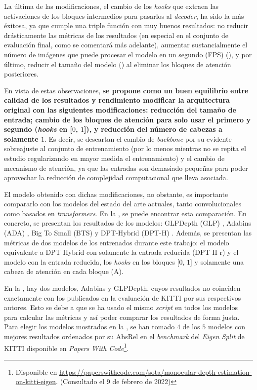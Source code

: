 La última de las modificaciones, el cambio de los \textit{hooks} que extraen las activaciones de los bloques intermedios para pasarlos al \textit{decoder}, ha sido la más éxitosa, ya que cumple una triple función con muy buenos resultados: no reducir drásticamente las métricas de los resultados (en especial en el conjunto de evaluación final, como se comentará más adelante), aumentar sustancialmente el número de imágenes que puede procesar el modelo en un segundo (FPS) (), y por último, reducir el tamaño del modelo () al eliminar los bloques de atención posteriores.

En vista de estas observaciones, \textbf{se propone como un buen equilibrio entre calidad de los resultados y rendimiento modificar la arquitectura original con las siguientes modificaciones: reducción del tamaño de entrada; cambio de los bloques de atención para solo usar el primero y segundo (\textit{hooks} en [$0$, $1$]), y reducción del número de cabezas a solamente $1$}. Es decir, se descartan el cambio de \textit{backbone} por su evidente sobreajuste al conjunto de entrenamiento (por lo menos mientras no se repita el estudio regularizando en mayor medida el entrenamiento) y el cambio de mecanismo de atención, ya que las entradas son demasiado pequeñas para poder aprovechar la reducción de complejidad computacional que lleva asociada.

El modelo obtenido con dichas modificaciones, no obstante, es importante compararlo con los modelos del estado del arte actuales, tanto convolucionales como basados en \textit{transformers}. En la , se puede encontrar esta comparación. En concreto, se presentan los resultados de los modelos: GLPDepth (GLP) \cite{glpdepth}, Adabins (ADA) \cite{bhat2020adabins}, Big To Small (BTS) \cite{bts} y DPT-Hybrid (DPT-H) \cite{visiontransformersDPT}. Además, se presentan las métricas de dos modelos de los entrenados durante este trabajo: el modelo equivalente a DPT-Hybrid con solamente la entrada reducida (DPT-H-r) y el modelo con la entrada reducida, los \textit{hooks} en los bloques [$0$, $1$] y solamente una cabeza de atención en cada bloque (A). 

En la , hay dos modelos, Adabins y GLPDepth, cuyos resultados no coinciden exactamente con los publicados en la evaluación de KITTI por sus respectivos autores. Esto se debe a que se ha usado el mismo \textit{script} en todos los modelos para calcular las métricas y así poder comparar los resultados de forma justa. Para elegir los modelos mostrados en la , se han tomado $4$ de los $5$ modelos con mejores resultados ordenados por su AbsRel en el \textit{benchmark} del \textit{Eigen Split} de KITTI disponible en \textit{Papers With Code}\footnote{Disponible en \url{https://paperswithcode.com/sota/monocular-depth-estimation-on-kitti-eigen}. \linebreak (Consultado el 9 de febrero de 2022)}.


